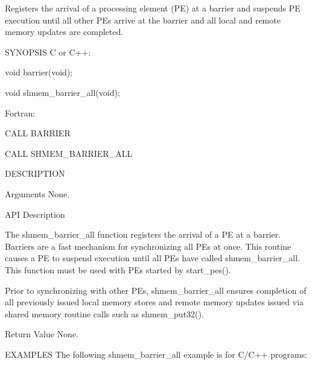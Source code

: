 Registers  the  arrival of a processing element (PE) at a barrier and suspends PE execution until all other PEs arrive at the barrier and all local and remote memory updates are completed.

SYNOPSIS
       C or C++:

	  void barrier(void);

	  void shmem_barrier_all(void);

       Fortran:

	  CALL BARRIER

	  CALL SHMEM_BARRIER_ALL

DESCRIPTION

Arguments
       None.

API Description

       The  shmem_barrier_all  function	 registers  the	 arrival  of a PE at a
       barrier.	 Barriers are a fast mechanism for synchronizing  all  PEs  at
       once.  This routine causes a PE to suspend execution until all PEs have
       called shmem_barrier_all.  This function must be used with PEs  started
       by start_pes().

       Prior  to  synchronizing	 with  other  PEs,  shmem_barrier_all  ensures
       completion of all previously issued  local  memory  stores  and	remote
       memory	updates	 issued	 via  shared  memory  routine  calls  such  as
       shmem_put32().

Return Value
       None.

EXAMPLES
	The following shmem_barrier_all example is for C/C++ programs:

       
